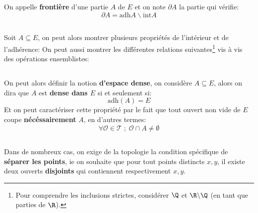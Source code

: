 \subsection*{}
On appelle \textbf{frontière} d'une partie \(A\) de \(E\) et on note \(\partial A\) la partie qui vérifie:
\[
   \partial A = \text{adh}{A} \backslash \text{int}{A}
\]
\pagebreak
\subsection*{}
Soit \(A \subseteq E\), on peut alors montrer plusieurs propriétés de l'intérieur et de l'adhérence:
On peut aussi montrer les différentes relations suivantes\footnote[1]{Pour comprendre les inclusions strictes, considérer \(\Q\) et \(\R \backslash \Q\) (en tant que parties de \(\R\)).} vis à vis des opérations ensemblistes:
\subsection*{}
On peut alors définir la notion \textbf{d'espace dense}, on considère \(A \subseteq E\), alors on dira que \(A\) est \textbf{dense dans \(E\)} si et seulement si:
\[
   \text{adh}(A) = E
\]
Et on peut caractériser cette propriété par le fait que tout ouvert non vide de \(E\) coupe \textbf{nécéssairement} \(A\), en d'autres termes:
\[
   \forall \mathcal{O} \in \mathcal{T} \; ; \; \mathcal{O} \cap A \neq \emptyset
\]
\subsection*{}
Dans de nombreux cas, on exige de la topologie la condition spécifique de \textbf{séparer les points}, ie on souhaite que pour tout points distincts \(x, y\), il existe deux ouverts \textbf{disjoints} qui contiennent respectivement \(x, y\).\<

